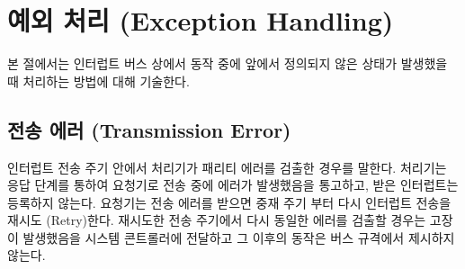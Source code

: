 \section{예외 처리 (Exception Handling)}
본 절에서는 인터럽트 버스 상에서 동작 중에 앞에서 정의되지 않은 상태가 발생했을 때
처리하는 방법에 대해 기술한다.

\subsection{전송 에러 (Transmission Error)}
인터럽트 전송 주기 안에서 처리기가 패리티 에러를 검출한 경우를 말한다.
처리기는 응답 단계를 통하여 요청기로 전송 중에 에러가 발생했음을 통고하고,
받은 인터럽트는 등록하지 않는다. 요청기는 전송 에러를 받으면
중재 주기 부터 다시 인터럽트 전송을 재시도 (Retry)한다.
재시도한 전송 주기에서 다시 동일한 에러를 검출할 경우는 고장이 발생했음을
시스템 콘트롤러에 전달하고 그 이후의 동작은 버스 규격에서 제시하지 않는다.
